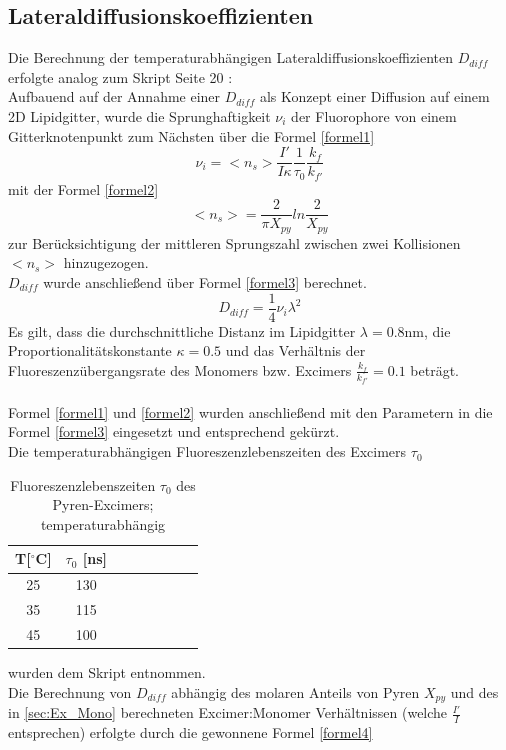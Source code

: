 \subsection{Lateraldiffusionskoeffizienten}
Die Berechnung der temperaturabhängigen Lateraldiffusionskoeffizienten $D_{diff}$ erfolgte analog zum Skript Seite 20 \cite{Kursskript} :\\
Aufbauend auf der Annahme einer $D_{diff}$ als Konzept einer Diffusion auf einem 2D Lipidgitter, wurde die Sprunghaftigkeit $\nu_i$ der Fluorophore von einem Gitterknotenpunkt zum Nächsten über die Formel \ref{formel1}
\begin{equation}\label{formel1}
\nu_i = <n_s> \frac{I'}{I\kappa}\frac{1}{\tau_0}\frac{k_f}{k_{f'}}
\end{equation}
mit der Formel \ref{formel2} 
\begin{equation}\label{formel2}
<n_s>=\frac{2}{\pi X_{py}}ln\frac{2}{X_{py}}
\end{equation}
zur Berücksichtigung der mittleren Sprungszahl zwischen zwei Kollisionen $<n_s>$  hinzugezogen.\\
$D_{diff}$ wurde anschließend über Formel \ref{formel3} berechnet.
\begin{equation}\label{formel3}
D_{diff}=\frac{1}{4}\nu_i \lambda^2
\end{equation}
Es gilt, dass die durchschnittliche Distanz im Lipidgitter $\lambda=0.8\text{nm}$, die Proportionalitätskonstante $\kappa=0.5$ und das Verhältnis der Fluoreszenzübergangsrate des Monomers bzw. Excimers $\frac{k_f}{k_{f'}}=0.1$ beträgt.\\\\
Formel \ref{formel1} und \ref{formel2} wurden anschließend mit den Parametern in die Formel \ref{formel3} eingesetzt und entsprechend gekürzt. \\
 Die temperaturabhängigen Fluoreszenzlebenszeiten des Excimers $\tau_0$
  \begin{table} [h]
 	\footnotesize
 	\begin{center}
 		\caption{Fluoreszenzlebenszeiten $\tau_0$ des Pyren-Excimers; temperaturabhängig}
 		\begin{tabular} {c c c l l l l l}
 			T[$^\circ$C]&  $\tau_0$ [ns] \\ \hline
 			25& 130 \\ \hline 
 			35&	115 \\ \hline 
 			45&	100 \\ \hline 
 		\end{tabular}
 		\label{tab:Lebenszeiten}
 	\end{center}
 \end{table}
wurden dem Skript entnommen.\\
Die Berechnung von $D_{diff}$ abhängig des molaren Anteils von Pyren $X_{py}$ und des in \ref{sec:Ex_Mono} berechneten Excimer:Monomer Verhältnissen (welche $\frac{I'}{I}$ entsprechen) erfolgte durch die gewonnene Formel \ref{formel4}


